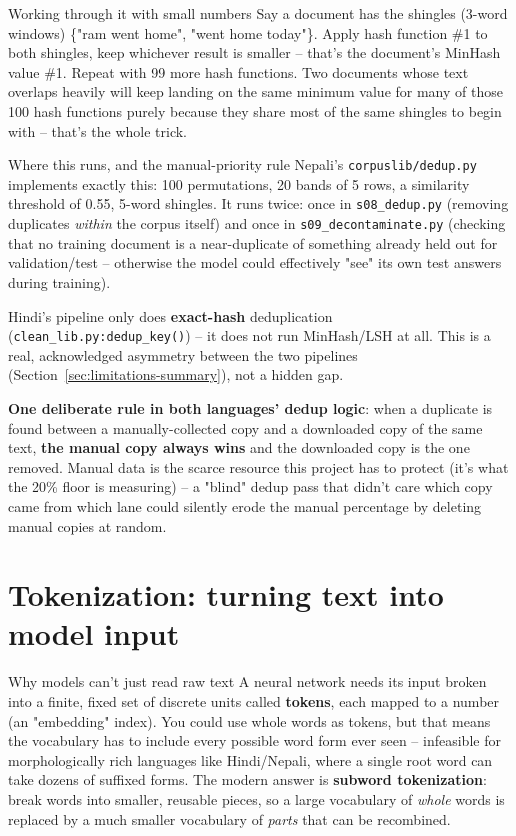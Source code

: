 \documentclass[11pt]{report}
\begin{document}
\begin{example}{Working through it with small numbers}
Say a document has the shingles (3-word windows) \{"ram went home",
"went home today"\}. Apply hash function \#1 to both shingles, keep
whichever result is smaller -- that's the document's MinHash value \#1.
Repeat with 99 more hash functions. Two documents whose text overlaps
heavily will keep landing on the same minimum value for many of those
100 hash functions purely because they share most of the same shingles
to begin with -- that's the whole trick.
\end{example}

\begin{implementation}{Where this runs, and the manual-priority rule}
Nepali's \texttt{corpuslib/dedup.py} implements exactly this: 100
permutations, 20 bands of 5 rows, a similarity threshold of 0.55,
5-word shingles. It runs twice: once in \texttt{s08\_dedup.py} (removing
duplicates \textit{within} the corpus itself) and once in
\texttt{s09\_decontaminate.py} (checking that no training document is a
near-duplicate of something already held out for validation/test --
otherwise the model could effectively "see" its own test answers during
training).

Hindi's pipeline only does \textbf{exact-hash} deduplication
(\texttt{clean\_lib.py:dedup\_key()}) -- it does not run MinHash/LSH at
all. This is a real, acknowledged asymmetry between the two pipelines
(Section~\ref{sec:limitations-summary}), not a hidden gap.

\textbf{One deliberate rule in both languages' dedup logic}: when a
duplicate is found between a manually-collected copy and a
downloaded copy of the same text, \textbf{the manual copy always wins}
and the downloaded copy is the one removed. Manual data is the scarce
resource this project has to protect (it's what the 20\% floor is
measuring) -- a "blind" dedup pass that didn't care which copy came from
which lane could silently erode the manual percentage by deleting manual
copies at random.
\end{implementation}

\section{Tokenization: turning text into model input}

\begin{concept}{Why models can't just read raw text}
A neural network needs its input broken into a finite, fixed set of
discrete units called \textbf{tokens}, each mapped to a number (an
"embedding" index). You could use whole words as tokens, but that means
the vocabulary has to include every possible word form ever
seen -- infeasible for morphologically rich languages like Hindi/Nepali,
where a single root word can take dozens of suffixed forms. The modern
answer is \textbf{subword tokenization}: break words into smaller,
reusable pieces, so a large vocabulary of \textit{whole} words is
replaced by a much smaller vocabulary of \textit{parts} that can be
recombined.
\end{concept}
\end{document}
